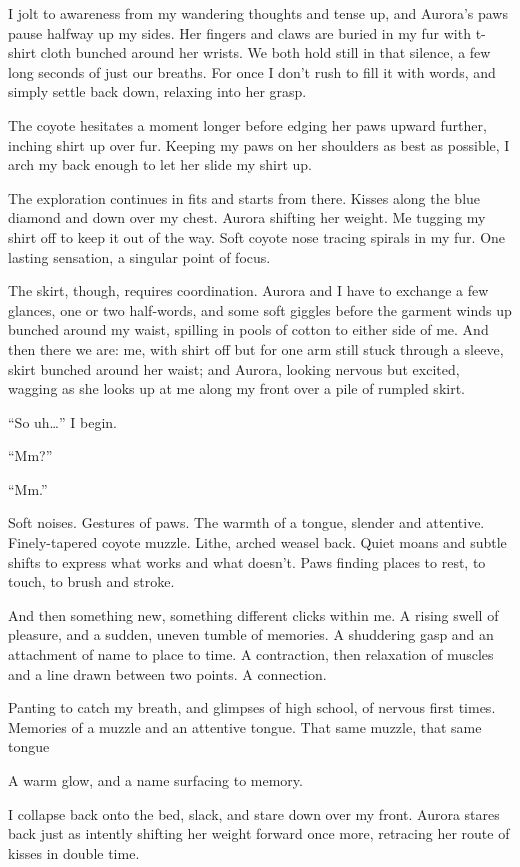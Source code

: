 I jolt to awareness from my wandering thoughts and tense up, and Aurora's paws pause halfway up my sides. Her fingers and claws are buried in my fur with t-shirt cloth bunched around her wrists. We both hold still in that silence, a few long seconds of just our breaths. For once I don't rush to fill it with words, and simply settle back down, relaxing into her grasp.

The coyote hesitates a moment longer before edging her paws upward further, inching shirt up over fur. Keeping my paws on her shoulders as best as possible, I arch my back enough to let her slide my shirt up.

The exploration continues in fits and starts from there. Kisses along the blue diamond and down over my chest. Aurora shifting her weight. Me tugging my shirt off to keep it out of the way. Soft coyote nose tracing spirals in my fur. One lasting sensation, a singular point of focus.

The skirt, though, requires coordination. Aurora and I have to exchange a few glances, one or two half-words, and some soft giggles before the garment winds up bunched around my waist, spilling in pools of cotton to either side of me. And then there we are: me, with shirt off but for one arm still stuck through a sleeve, skirt bunched around her waist; and Aurora, looking nervous but excited, wagging as she looks up at me along my front over a pile of rumpled skirt.

``So uh\ldots{}'' I begin.

``Mm?''

``Mm.''

Soft noises. Gestures of paws. The warmth of a tongue, slender and attentive. Finely-tapered coyote muzzle. Lithe, arched weasel back. Quiet moans and subtle shifts to express what works and what doesn't. Paws finding places to rest, to touch, to brush and stroke.

And then something new, something different clicks within me. A rising swell of pleasure, and a sudden, uneven tumble of memories. A shuddering gasp and an attachment of name to place to time. A contraction, then relaxation of muscles and a line drawn between two points. A connection.

Panting to catch my breath, and glimpses of high school, of nervous first times. Memories of a muzzle and an attentive tongue. That same muzzle, that same tongue

A warm glow, and a name surfacing to memory.

I collapse back onto the bed, slack, and stare down over my front. Aurora stares back just as intently shifting her weight forward once more, retracing her route of kisses in double time.

